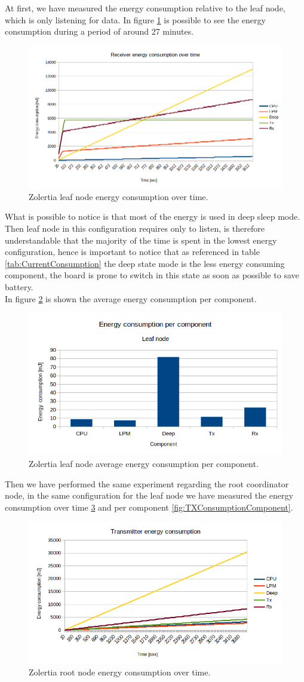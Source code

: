 \documentclass[conference]{IEEEtran}
\begin{document}
At first, we have measured the energy consumption relative to the leaf node, which is only listening for data.
In figure \ref{fig:RXConsumptionTime} is possible to see the energy consumption during a period of around 27 minutes.
\begin{figure}[]
	\centering
	\includegraphics[width=.5\textwidth,keepaspectratio]{RXConsumptionTime.png}
	\caption{Zolertia leaf node energy consumption over time.}
	\label{fig:RXConsumptionTime}
\end{figure}
What is possible to notice is that most of the energy is used in deep sleep mode.\\
Then leaf node in this configuration requires only to listen, is therefore understandable that the majority of the time is spent in the lowest energy configuration, hence is important to notice that as referenced in table \ref{tab:CurrentConsumption} the deep state mode is the less energy consuming component, the board is prone to switch in this state as soon as possible to save battery.\\
In figure \ref{fig:RXConsumptionComponent} is shown the average energy consumption per component.\\
\begin{figure}[]
	\centering
	\includegraphics[width=.5\textwidth,keepaspectratio]{RXConsumptionComponent.png}
	\caption{Zolertia leaf node average energy consumption per component.}
	\label{fig:RXConsumptionComponent}
\end{figure}
Then we have performed the same experiment regarding the root coordinator node, in the same configuration for the leaf node we have measured the energy consumption over time \ref{fig:TXConsumptionTime} and per component \ref{fig:TXConsumptionComponent}.
\begin{figure}[H]
	\centering
	\includegraphics[width=.5\textwidth,keepaspectratio]{TXConsumptionTime.png}
	\caption{Zolertia root node energy consumption over time.}
	\label{fig:TXConsumptionTime}
\end{figure}
\end{document}
